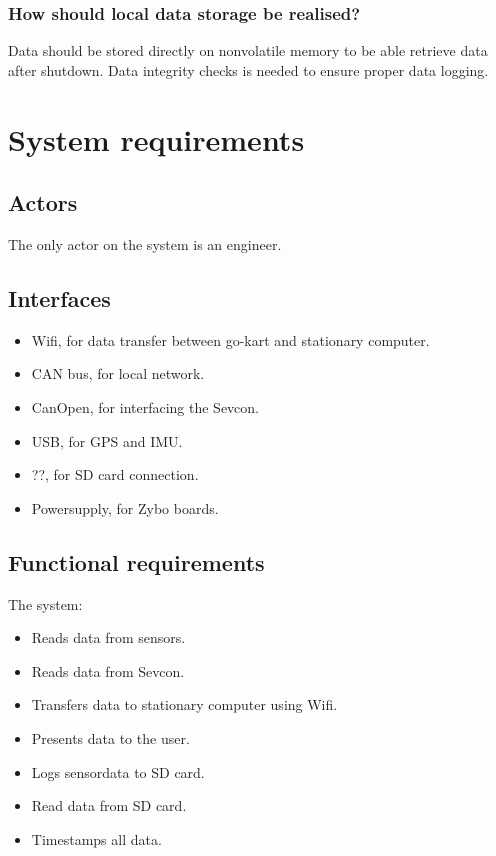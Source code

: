 \subsubsection*{How should local data storage be realised?}
Data should be stored directly on nonvolatile memory to be able retrieve data after shutdown.
Data integrity checks is needed to ensure proper data logging.


\newpage
\section{System requirements}

\subsection{Actors}
The only actor on the system is an engineer.

\subsection{Interfaces}
\begin{itemize}
\item Wifi, for data transfer between go-kart and stationary computer.
\item CAN bus, for local network.
\item CanOpen, for interfacing the Sevcon.
\item USB, for GPS and IMU.
\item ??, for SD card connection.
\item Powersupply, for Zybo boards.
\end{itemize}

\subsection{Functional requirements}
The system: 
\begin{itemize}
\item Reads data from sensors.
\item Reads data from Sevcon.
\item Transfers data to stationary computer using Wifi.
\item Presents data to the user.
\item Logs sensordata to SD card.
\item Read data from SD card.
\item Timestamps all data. 
\end{itemize}


